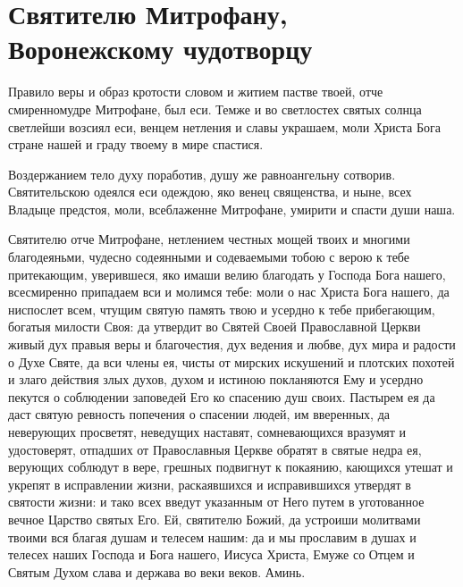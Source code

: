 \mychapterending





\section{Святителю Митрофану, Воронежскому чудотворцу}\begin{mymulticols}



Правило веры и образ кротости словом и житием пастве твоей, отче смиренномудре Митрофане, был еси. Темже и во светлостех святых солнца светлейши возсиял еси, венцем нетления и славы украшаем, моли Христа Бога стране нашей и граду твоему в мире спастися.



Воздержанием тело духу поработив, душу же равноангельну сотворив. Святительскою одеялся еси одеждою, яко венец священства, и ныне, всех Владыце предстоя, моли, всеблаженне Митрофане, умирити и спасти души наша.



Святителю отче Митрофане, нетлением честных мощей твоих и многими благодеяньми, чудесно содеянными и содеваемыми тобою с верою к тебе притекающим, уверившеся, яко имаши велию благодать у Господа Бога нашего, всесмиренно припадаем вси и молимся тебе: моли о нас Христа Бога нашего, да ниспослет всем, чтущим святую память твою и усердно к тебе прибегающим, богатыя милости Своя: да утвердит во Святей Своей Православной Церкви живый дух правыя веры и благочестия, дух ведения и любве, дух мира и радости о Духе Святе, да вси члены ея, чисты от мирских искушений и плотских похотей и злаго действия злых духов, духом и истиною покланяются Ему и усердно пекутся о соблюдении заповедей Его ко спасению душ своих. Пастырем ея да даст святую ревность попечения о спасении людей, им вверенных, да неверующих просветят, неведущих наставят, сомневающихся вразумят и удостоверят, отпадших от Православныя Церкве обратят в святые недра ея, верующих соблюдут в вере, грешных подвигнут к покаянию, кающихся утешат и укрепят в исправлении жизни, раскаявшихся и исправившихся утвердят в святости жизни: и тако всех введут указанным от Него путем в уготованное вечное Царство святых Его. Ей, святителю Божий, да устроиши молитвами твоими вся благая душам и телесем нашим: да и мы прославим в душах и телесех наших Господа и Бога нашего, Иисуса Христа, Емуже со Отцем и Святым Духом слава и держава во веки веков. Аминь.


\end{mymulticols}

